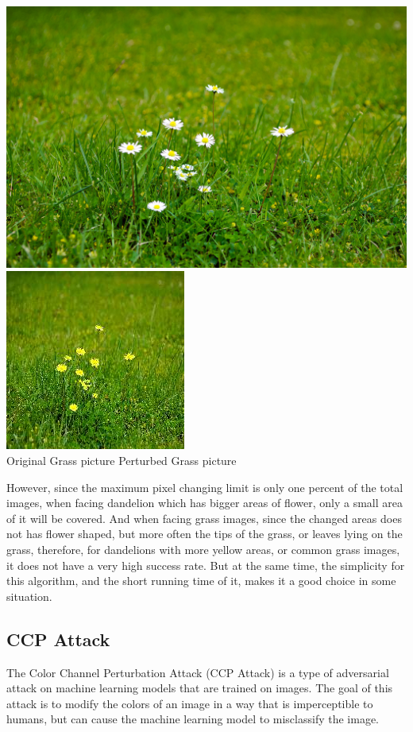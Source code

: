 \documentclass{article}
\begin{document}
\begin{center}
\includegraphics[scale=0.08]{flowers-on-the-grass-579853868.jpg} \hspace{15pt}
\includegraphics[scale=0.5]{thumbnail_image_13.jpg}\\
\hspace{25pt}Original Grass picture 
\hspace{45pt} Perturbed Grass picture\
\end{center}
\vspace{0.1in}
However, since the maximum pixel changing limit is only one percent of the total images, when facing dandelion which has bigger areas of flower, only a small area of it will be covered. And when facing grass images, since the changed areas does not has flower shaped, but more often the tips of the grass, or leaves lying on the grass, therefore, for dandelions with more yellow areas, or common grass images, it does not have a very high success rate. But at the same time, the simplicity for this algorithm, and the short running time of it, makes it a good choice in some situation. 

\subsection{CCP Attack}
The Color Channel Perturbation Attack (CCP Attack) is a type of adversarial attack on machine learning models that are trained on images. The goal of this attack is to modify the colors of an image in a way that is imperceptible to humans, but can cause the machine learning model to misclassify the image.
\end{document}
